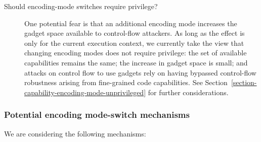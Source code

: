 \begin{description}
\item[Should encoding-mode switches require privilege?]
  One potential fear is that an additional encoding mode increases the gadget
  space available to control-flow attackers.
  As long as the effect is only for the current execution context,
  we currently take the view that changing encoding modes
  does not require privilege: the set of available capabilities remains the
  same; the increase in gadget space is small; and attacks on control flow to
  use gadgets rely on having bypassed control-flow robustness arising from
  fine-grained code capabilities.
  See Section~\ref{section-capability-encoding-mode-unprivileged} for further
  considerations.
\end{description}

\subsubsection{Potential encoding mode-switch mechanisms}

We are considering the following mechanisms:

